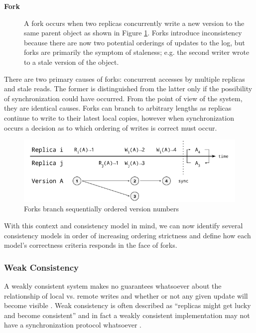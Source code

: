 \documentclass{article}
\begin{document}
\begin{description}
    \item[\textbf{Fork}] A fork occurs when two replicas concurrently write a new version to the same parent object as shown in Figure \ref{fig:forks}. Forks introduce inconsistency because there are now two potential orderings of updates to the log, but forks are primarily the symptom of staleness; e.g. the second writer wrote to a stale version of the object.
\end{description}

There are two primary causes of forks: concurrent accesses by multiple replicas and stale reads. The former is distinguished from the latter only if the possibility of synchronization could have occurred. From the point of view of the system, they are identical causes. Forks can branch to arbitrary lengths as replicas continue to write to their latest local copies, however when synchronization occurs a decision as to which ordering of writes is correct must occur.

\begin{figure}
    \centering
        \includegraphics[width=.9\textwidth]{figures/forks}
        \caption{Forks branch sequentially ordered version numbers}
        \label{fig:forks}
\end{figure}

With this context and consistency model in mind, we can now identify several consistency models in order of increasing ordering strictness and define how each model's correctness criteria responds in the face of forks.

\subsubsection{Weak Consistency}

A weakly consistent system makes no guarantees whatsoever about the relationship of local vs. remote writes and whether or not any given update will become visible \cite{vogels_eventually_2009}. Weak consistency is often described as ``replicas might get lucky and become consistent'' and in fact a weakly consistent implementation may not have a synchronization protocol whatsoever \cite{bermbach_consistency_2013}.
\end{document}
